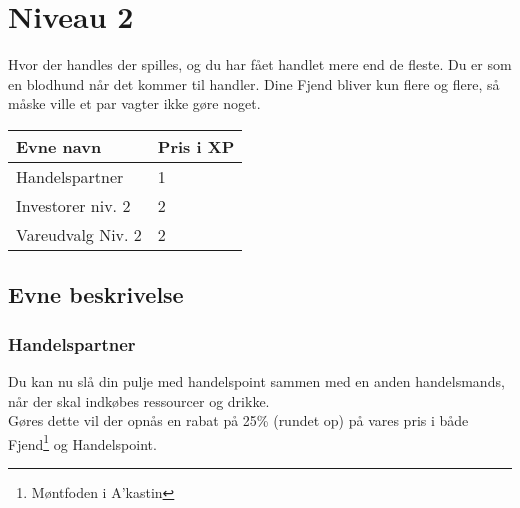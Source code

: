 \chapter{Niveau 2}
Hvor der handles der spilles, og du har fået handlet mere end de fleste. Du er som en blodhund når det kommer til handler. Dine Fjend bliver kun flere og flere, så måske ville et par vagter ikke gøre noget.

\begin{table}[H]
    \centering
    \begin{tabular}{|p{}|p{}|}
    \rowcolor{cerulean!80}\hline
        Evne navn & Pris i XP \\\hline
         Handelspartner & 1 \\\hline
         Investorer niv. 2 & 2 \\\hline
         Vareudvalg Niv. 2 & 2 \\\hline
    \end{tabular}
\end{table}
\section{Evne beskrivelse}

\subsection{Handelspartner}
Du kan nu slå din pulje med handelspoint sammen med en anden handelsmands, når der skal indkøbes ressourcer og drikke.\\
Gøres dette vil der opnås en rabat på 25\% (rundet op) på vares pris i både Fjend\footnote{Møntfoden i A'kastin} og Handelspoint.





